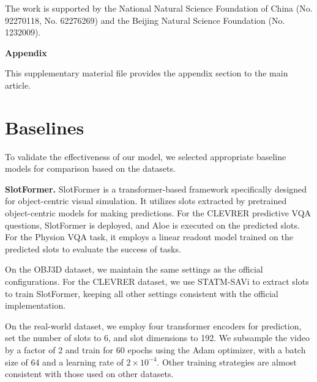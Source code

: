 \documentclass[sigconf]{acmart}
\begin{document}
\begin{acks}
The work is supported by the National Natural Science Foundation of China (No. 92270118, No. 62276269) and the Beijing Natural Science Foundation (No. 1232009).
\end{acks}


\balance




\clearpage
\appendix
\balance

\setcounter{figure}{0}
\setcounter{table}{0}
\renewcommand{\thefigure}{S\arabic{figure}}
\renewcommand{\thetable}{S\arabic{table}}

\begin{center}
    {\Large \textbf{Appendix}}
\end{center}

This supplementary material file provides the appendix section to the main article.

\section{Baselines}
\label{append-baseline}

To validate the effectiveness of our model, we selected appropriate baseline models for comparison based on the datasets.

\textbf{SlotFormer.} SlotFormer \cite{wu2023SlotFormer} is a transformer-based framework specifically designed for object-centric visual simulation. It utilizes slots extracted by pretrained object-centric models for making predictions. For the CLEVRER predictive VQA questions, SlotFormer is deployed, and Aloe is executed on the predicted slots. For the Physion VQA task, it employs a linear readout model trained on the predicted slots to evaluate the success of tasks.

On the OBJ3D dataset, we maintain the same settings as the official configurations. For the CLEVRER dataset, we use STATM-SAVi to extract slots to train SlotFormer, keeping all other settings consistent with the official implementation.

On the real-world dataset, we employ four transformer encoders for prediction, set the number of slots to 6, and slot dimensions to 192. We subsample the video by a factor of 2 and train for 60 epochs using the Adam optimizer, with a batch size of 64 and a learning rate of $2\times 10^{-4}$. Other training strategies are almost consistent with those used on other datasets.
\end{document}
